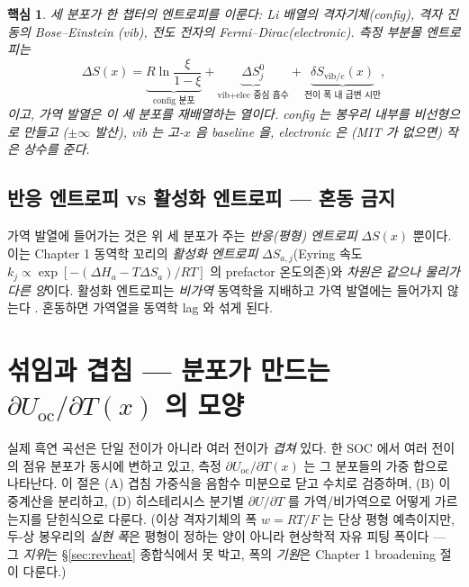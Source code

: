 \documentclass[11pt,a4paper]{article}
\newtheorem*{keybox}{핵심}
\newcommand{\oc}{\mathrm{oc}}
\newcommand{\vib}{\mathrm{vib}}
\begin{document}
\begin{keybox}
세 분포가 한 챕터의 엔트로피를 이룬다: Li 배열의 \emph{격자기체}(config), 격자 진동의 \emph{Bose--Einstein}
(vib), 전도 전자의 \emph{Fermi--Dirac}(electronic). 측정 부분몰 엔트로피는
\[
\Delta S(x)=\underbrace{R\ln\frac{\xi}{1-\xi}}_{\text{config 분포}}
+\underbrace{\Delta S^0_j}_{\text{vib+elec 중심 흡수}}
+\underbrace{\delta S_{\vib/e}(x)}_{\text{전이 폭 내 급변 시만}},
\]
이고, 가역 발열은 이 세 분포를 재배열하는 열이다. config 는 봉우리 \emph{내부}를 비선형으로 만들고
($\pm\infty$ 발산), vib 는 고-$x$ 음 baseline 을, electronic 은 (MIT 가 없으면) 작은 상수를 준다.
\end{keybox}

\subsection{반응 엔트로피 vs 활성화 엔트로피 — 혼동 금지}
가역 발열에 들어가는 것은 위 세 분포가 주는 \emph{반응(평형) 엔트로피} $\Delta S(x)$ 뿐이다. 이는 Chapter 1
동역학 꼬리의 \emph{활성화 엔트로피} $\Delta S_{a,j}$(Eyring 속도 $k_j\propto\exp[-(\Delta H_a-T\Delta S_a)/RT]$
의 prefactor 온도의존)와 \emph{차원은 같으나 물리가 다른 양}이다. 활성화 엔트로피는 \emph{비가역} 동역학을
지배하고 가역 발열에는 들어가지 않는다 \cite{msmr_partI}. 혼동하면 가역열을 동역학 lag 와 섞게 된다.

\section{섞임과 겹침 — 분포가 만드는 $\partial U_\oc/\partial T(x)$ 의 모양}\label{sec:mixing}
실제 흑연 곡선은 단일 전이가 아니라 여러 전이가 \emph{겹쳐} 있다. 한 SOC 에서 여러 전이의 점유 분포가 동시에
변하고 있고, 측정 $\partial U_\oc/\partial T(x)$ 는 그 분포들의 가중 합으로 나타난다. 이 절은 (A) 겹침 가중식을
음함수 미분으로 닫고 수치로 검증하며, (B) 이중계산을 분리하고, (D) 히스테리시스 분기별 $\partial U/\partial T$ 를
가역/비가역으로 어떻게 가르는지를 닫힌식으로 다룬다. (이상 격자기체의 폭 $w=RT/F$ 는 단상 평형 예측이지만,
두-상 봉우리의 \emph{실현 폭}은 평형이 정하는 양이 아니라 현상학적 자유 피팅 폭이다 — 그 \emph{지위}는
\S\ref{sec:revheat} 종합식에서 못 박고, 폭의 \emph{기원}은 Chapter 1 broadening 절이 다룬다.)
\end{document}
